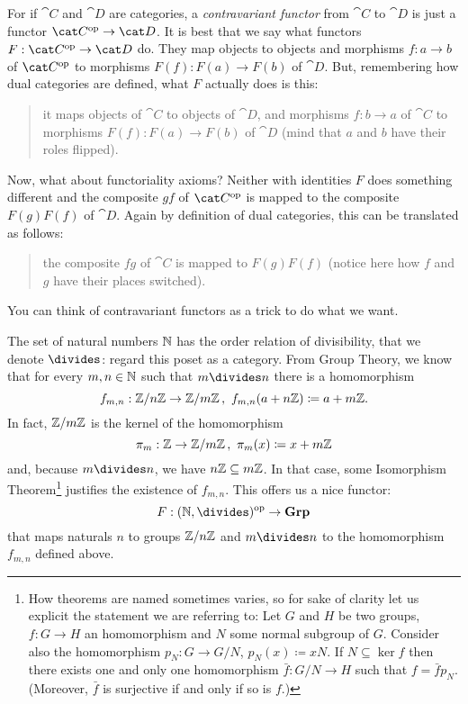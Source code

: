 For if \(\cat C\) and \(\cat D\) are categories, a {\em contravariant functor} from \(\cat C\) to \(\cat D\) is just a functor \(\op{\cat C} \to \cat D\). It is best that we say what functors \(F : \op{\cat C} \to \cat D\) do. They map objects to objects and morphisms \(f : a \to b\) of \(\op{\cat C}\) to morphisms \(F(f) : F(a) \to F(b)\) of \(\cat D\). But, remembering how dual categories are defined, what \(F\) actually does is this:
\begin{quotation}
it maps objects of \(\cat C\) to objects of \(\cat D\), and morphisms \(f : b \to a\) of \(\cat C\) to morphisms \(F(f) : F(a) \to F(b)\) of \(\cat D\) (mind that \(a\) and \(b\) have their roles flipped).
\end{quotation}
Now, what about functoriality axioms? Neither with identities \(F\) does something different and the composite \(gf\) of \(\op{\cat C}\) is mapped to the composite \(F(g)F(f)\) of \(\cat D\). Again by definition of dual categories, this can be translated as follows:
\begin{quotation}
the composite \(fg\) of \(\cat C\) is mapped to \(F(g)F(f)\) (notice here how \(f\) and \(g\) have their places switched).
\end{quotation}
You can think of contravariant functors as a trick to do what we want.

\begin{example}
The set of natural numbers \(\mathbb N\) has the order relation of divisibility, that we denote \(\divides\): regard this poset as a category. From Group Theory, we know that for every \(m, n \in \mathbb N\) such that \(m \divides n\) there is a homomorphism
\[f_{m, n} : \mathbb Z/n\mathbb Z \to \mathbb Z/m\mathbb Z\,,\ f_{m, n}(a +n\mathbb Z) \coloneq a + m\mathbb Z .\]
In fact, \(\mathbb Z/m\mathbb Z\) is the kernel of the homomorphism
\[\pi_m : \mathbb Z \to \mathbb Z/m\mathbb Z\,, \ \pi_m(x) \coloneq x + m\mathbb Z\]
and, because \(m \divides n\), we have \(n\mathbb Z \subseteq m\mathbb Z\). In that case, some Isomorphism Theorem\footnote{How theorems are named sometimes varies, so for sake of clarity let us explicit the statement we are referring to: Let \(G\) and \(H\) be two groups, \(f : G \to H\) an homomorphism and \(N\) some normal subgroup of \(G\). Consider also the homomorphism \(p_N : G \to G/N\), \(p_N(x) \coloneq xN\). If \(N \subseteq \ker f\) then there exists one and only one homomorphism \(\bar f : G/N \to H\) such that
\(f = \bar f p_N\).
(Moreover, \(\bar f\) is surjective if and only if so is \(f\).)} justifies the existence of \(f_{m, n}\).
This offers us a nice functor:
\[F : \op{(\naturals, \divides)} \to \Grp\]
that maps naturals \(n\) to groups \(\mathbb Z/n\mathbb Z\) and \(m \divides n\) to the homomorphism \(f_{m,n}\) defined above.
\end{example}

